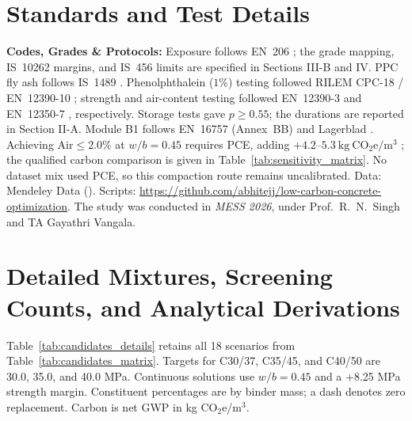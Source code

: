 \documentclass[journal]{IEEEtran}
\begin{document}
\appendices
\section{Standards and Test Details}
\label{sec:appendix_standards}
\textbf{Codes, Grades \& Protocols:} Exposure follows EN~206 \cite{en206}; the grade mapping, IS~10262 margins, and IS~456 limits are specified in Sections III-B and IV. PPC fly ash follows IS~1489 \cite{is1489}. Phenolphthalein ($1\%$) testing followed RILEM CPC-18 / EN~12390-10 \cite{hule2024}; strength and air-content testing followed EN~12390-3 \cite{en12390} and EN~12350-7 \cite{en12350}, respectively. Storage tests gave $p\ge0.55$; the durations are reported in Section II-A. Module B1 follows EN~16757 (Annex~BB) \cite{en16757} and Lagerblad \cite{lagerblad2005}. Achieving $\mathrm{Air}\le2.0\%$ at $w/b=0.45$ requires PCE, adding $+4.2\text{--}5.3\ \mathrm{kg\ CO_2e/m^3}$ \cite{efca2021}; the qualified carbon comparison is given in Table~\ref{tab:sensitivity_matrix}. No dataset mix used PCE, so this compaction route remains uncalibrated. Data: Mendeley Data \cite{hule2024mendeley} (\cite{hule2024}). Scripts: \url{https://github.com/abhitejj/low-carbon-concrete-optimization}. The study was conducted in \textit{MESS 2026}, under Prof.~R.~N.~Singh and TA Gayathri Vangala.





\clearpage
\onecolumn
\section{Detailed Mixtures, Screening Counts, and Analytical Derivations}
\label{sec:appendix_candidates}
\noindent Table~\ref{tab:candidates_details} retains all 18 scenarios from Table~\ref{tab:candidates_matrix}. Targets for C30/37, C35/45, and C40/50 are 30.0, 35.0, and 40.0 MPa. Continuous solutions use $w/b=0.45$ and a +8.25 MPa strength margin. Constituent percentages are by binder mass; a dash denotes zero replacement. Carbon is net GWP in kg CO$_2$e/m$^3$.
\end{document}
